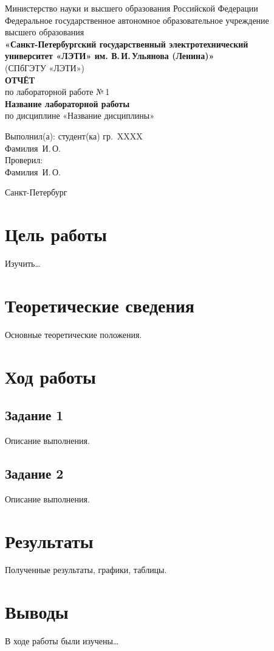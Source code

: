 \documentclass[12pt, a4paper]{article}
\begin{document}
\begin{titlepage}
  \centering
  {\small Министерство науки и высшего образования Российской Федерации}\\[0.3cm]
  {\small Федеральное государственное автономное образовательное учреждение\\высшего образования}\\[0.3cm]
  {\small\textbf{«Санкт-Петербургский государственный электротехнический\\университет «ЛЭТИ» им. В.\,И.\,Ульянова (Ленина)»}}\\[0.3cm]
  {\small (СПбГЭТУ «ЛЭТИ»)}\\[1.5cm]

  {\Large\textbf{ОТЧЁТ}}\\[0.3cm]
  {\large по лабораторной работе №\,1}\\[0.3cm]
  {\large\textbf{Название лабораторной работы}}\\[0.3cm]
  {\large по дисциплине «Название дисциплины»}\\[2cm]

  \begin{flushleft}
    \hspace{8cm} Выполнил(а): студент(ка) гр.\ XXXX \\
    \hspace{8cm} Фамилия~И.\,О. \\[0.5cm]
    \hspace{8cm} Проверил: \\
    \hspace{8cm} Фамилия~И.\,О.
  \end{flushleft}
  \vfill
  {\small Санкт-Петербург \\ \the\year}
\end{titlepage}

\tableofcontents
\newpage

\section{Цель работы}
Изучить\ldots

\section{Теоретические сведения}
Основные теоретические положения.

\section{Ход работы}

\subsection{Задание 1}
Описание выполнения.

\subsection{Задание 2}
Описание выполнения.

\section{Результаты}
Полученные результаты, графики, таблицы.

\section{Выводы}
В ходе работы были изучены\ldots
\end{document}
